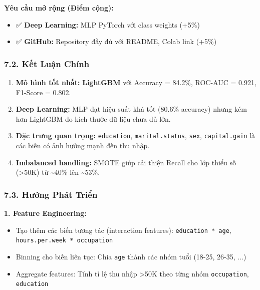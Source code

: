 \documentclass[
]{article}
\providecommand{\tightlist}{%
  \setlength{\itemsep}{0pt}\setlength{\parskip}{0pt}}
\begin{document}
\textbf{Yêu cầu mở rộng (Điểm cộng):}

\begin{itemize}
\tightlist
\item
  ✅ \textbf{Deep Learning:} MLP PyTorch với class weights (+5\%)
\item
  ✅ \textbf{GitHub:} Repository đầy đủ với README, Colab link (+5\%)
\end{itemize}

\subsubsection{7.2. Kết Luận
Chính}\label{72-kux1ebft-luux1eadn-chuxednh}

\begin{enumerate}
\def\labelenumi{\arabic{enumi}.}
\tightlist
\item
  \textbf{Mô hình tốt nhất:} \textbf{LightGBM} với Accuracy = 84.2\%,
  ROC-AUC = 0.921, F1-Score = 0.802.
\item
  \textbf{Deep Learning:} MLP đạt hiệu suất khá tốt (80.6\% accuracy)
  nhưng kém hơn LightGBM do kích thước dữ liệu chưa đủ lớn.
\item
  \textbf{Đặc trưng quan trọng:} \texttt{education},
  \texttt{marital.status}, \texttt{sex}, \texttt{capital.gain} là các
  biến có ảnh hưởng mạnh đến thu nhập.
\item
  \textbf{Imbalanced handling:} SMOTE giúp cải thiện Recall cho lớp
  thiểu số (\textgreater50K) từ \textasciitilde40\% lên
  \textasciitilde53\%.
\end{enumerate}

\subsubsection{7.3. Hướng Phát
Triển}\label{73-hux1b0ux1edbng-phuxe1t-triux1ec3n}

\textbf{1. Feature Engineering:}

\begin{itemize}
\tightlist
\item
  Tạo thêm các biến tương tác (interaction features):
  \texttt{education\ *\ age}, \texttt{hours.per.week\ *\ occupation}
\item
  Binning cho biến liên tục: Chia \texttt{age} thành các nhóm tuổi
  (18-25, 26-35, ...)
\item
  Aggregate features: Tính tỉ lệ thu nhập \textgreater50K theo từng nhóm
  \texttt{occupation}, \texttt{education}
\end{itemize}
\end{document}
